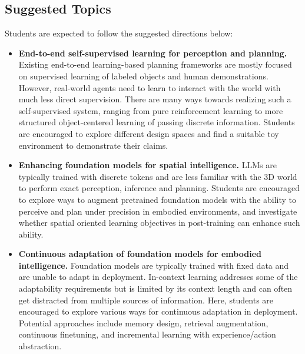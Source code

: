 \documentclass{article}
\begin{document}
\subsection{Suggested Topics}
Students are expected to follow the suggested directions below:
\begin{itemize}
  \item \textbf{End-to-end self-supervised learning for perception and planning.}
  Existing end-to-end learning-based planning frameworks are mostly focused on supervised learning of labeled objects and human demonstrations. However, real-world agents need to learn to interact with the world with much less direct supervision. There are many ways towards realizing such a self-supervised system, ranging from pure reinforcement learning to more structured object-centered learning of passing discrete information. Students are encouraged to explore different design spaces and find a suitable toy environment to demonstrate their claims.

  \item \textbf{Enhancing foundation models for spatial intelligence.}
  LLMs are typically trained with discrete tokens and are less familiar with the 3D world to perform exact perception, inference and planning. Students are encouraged to explore ways to augment pretrained foundation models with the ability to perceive and plan under precision in embodied environments, and investigate whether spatial oriented learning objectives in post-training can enhance such ability.

  \item \textbf{Continuous adaptation of foundation models for embodied intelligence.}
  Foundation models are typically trained with fixed data and are unable to adapt in deployment. In-context learning addresses some of the adaptability requirements but is limited by its context length and can often get distracted from multiple sources of information. Here, students are encouraged to explore various ways for continuous adaptation in deployment. Potential approaches include memory design, retrieval augmentation, continuous finetuning, and incremental learning with experience/action abstraction.
\end{itemize}
\end{document}
